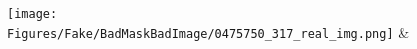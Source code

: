 \documentclass[runningheads]{llncs}
\begin{document}
\begin{figure}[tb]
\texttt{[image: Figures/Fake/BadMaskBadImage/0475750\_317\_real\_img.png]} &%
\end{figure}
\end{document}
